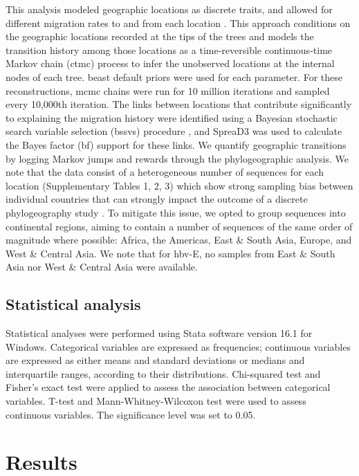 This analysis modeled geographic locations as discrete traits, and allowed for different migration rates to and from each location \citep{lemey2009bayesian}.
This approach conditions on the geographic locations recorded at the tips of the trees and models the transition history among those locations as a time-reversible continuous-time Markov chain (\gls{ctmc}) process to infer the unobserved locations at the internal nodes of each tree.
\gls{beast} default priors were used for each parameter.
For these reconstructions, \gls{mcmc} chains were run for 10 million iterations and sampled every 10,000th iteration.
The links between locations that contribute significantly to explaining the migration history were identified using a Bayesian stochastic search variable selection (\gls{bssvs}) procedure \citep{lemey2009bayesian}, and SpreaD3 \citep{bielejec2016spread3} was used to calculate the Bayes factor (\gls{bf}) support for these links.
We quantify geographic transitions by logging Markov jumps and rewards through the phylogeographic analysis.
We note that the data consist of a heterogeneous number of sequences for each location (Supplementary Tables 1, 2, 3) which show strong sampling bias between individual countries that can strongly impact the outcome of a discrete phylogeography study \citep{maio2015new}.
To mitigate this issue, we opted to group sequences into continental regions, aiming to contain a number of sequences of the same order of magnitude where possible: Africa, the Americas, East \& South Asia, Europe, and West \& Central Asia.
We note that for \gls{hbv}-E, no samples from East \& South Asia nor West \& Central Asia were available.

\subsection{Statistical analysis}
Statistical analyses were performed using Stata software version 16.1 for Windows.
Categorical variables are expressed as frequencies; continuous variables are expressed as either means and standard deviations or medians and interquartile ranges, according to their distributions.
Chi-squared test and Fisher's exact test were applied to assess the association between categorical variables.
T-test and Mann-Whitney-Wilcoxon test were used to assess continuous variables.
The significance level was set to 0.05.


\section{Results}
